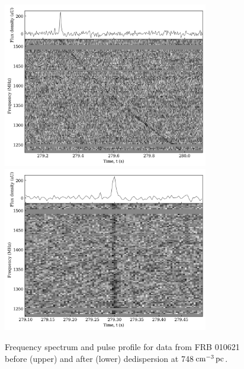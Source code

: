 \begin{figure}
    \centering
        \includegraphics[width=0.8\textwidth]{Images/FRB010621disp.jpg}
        \includegraphics[width=0.8\textwidth]{Images/FRB010621dedisp.jpg}
    \caption[Dedispersion]{Frequency spectrum and pulse profile for data from FRB 010621 before (upper) and after (lower) dedispersion at 748$\,\text{cm}^{-3}\,\text{pc}$.}
    \label{fig:dedisp}
\end{figure}

